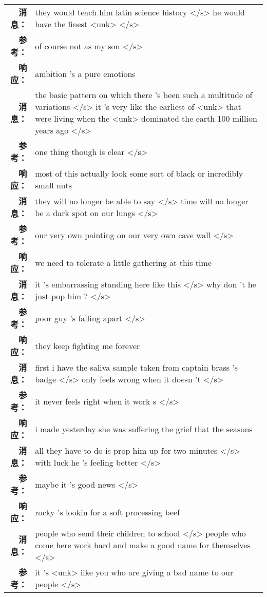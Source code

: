 \begin{tabularx}{\textwidth}{@{}rX@{}}%
\toprule%
\midrule%
\textbf{消息：}&they would teach him latin science history </s> he would have the finest <unk>  </s>\\%
\textbf{参考：}& of course not as my son </s>\\%
\textbf{响应：}&ambition 's a pure emotions\\%
\midrule%
\textbf{消息：}&the basic pattern on which there 's been such a multitude of variations </s> it 's very like the earliest of <unk> that were living when the <unk> dominated the earth 100 million years ago  </s>\\%
\textbf{参考：}& one thing though is clear </s>\\%
\textbf{响应：}&most of this actually look some sort of black or incredibly small nuts\\%
\midrule%
\textbf{消息：}&they will no longer be able to say </s> time will no longer be a dark spot on our lungs  </s>\\%
\textbf{参考：}& our very own painting on our very own cave wall </s>\\%
\textbf{响应：}&we need to tolerate a little gathering at this time\\%
\midrule%
\textbf{消息：}&it 's embarrassing standing here like this </s> why don 't he just pop him ?  </s>\\%
\textbf{参考：}& poor guy 's falling apart </s>\\%
\textbf{响应：}&they keep fighting me forever\\%
\midrule%
\textbf{消息：}&first i have the saliva sample taken from captain brass 's badge </s> only feels wrong when it doesn 't  </s>\\%
\textbf{参考：}& it never feels right when it work s </s>\\%
\textbf{响应：}&i made yesterday she was suffering the grief that the seasons\\%
\midrule%
\textbf{消息：}&all they have to do is prop him up for two minutes </s> with luck he 's feeling better  </s>\\%
\textbf{参考：}& maybe it 's good news </s>\\%
\textbf{响应：}&rocky 's lookin for a soft processing beef\\%
\midrule%
\textbf{消息：}&people who send their children to school </s> people who come here work hard and make a good name for themselves  </s>\\%
\textbf{参考：}& it 's <unk> iike you who are giving a bad name to our people </s>\\%

\end{tabularx}
